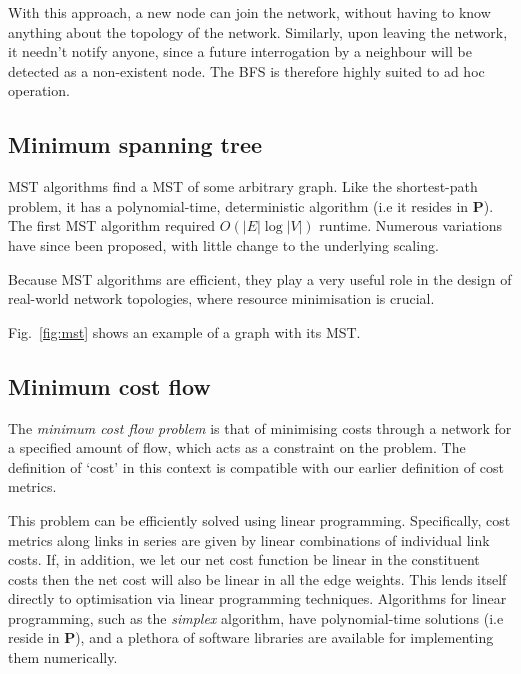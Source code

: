 \documentclass[aps,rmp,twocolumn,amsmath,amssymb,nofootinbib,superscriptaddress]{revtex4}
\begin{document}
With this approach, a new node can join the network, without having to know anything about the topology of the network. Similarly, upon leaving the network, it needn't notify anyone, since a future interrogation by a neighbour will be detected as a non-existent node. The BFS is therefore highly suited to ad hoc operation.

%
%

\subsection{Minimum spanning tree} \label{sec:min_tree}

MST algorithms find a MST of some arbitrary graph. Like the shortest-path problem, it has a polynomial-time, deterministic algorithm (i.e it resides in \textbf{P}). The first MST algorithm \cite{bib:Boruvka26} required $O(|E|\log |V|)$ runtime. Numerous variations have since been proposed, with little change to the underlying scaling.

Because MST algorithms are efficient, they play a very useful role in the design of real-world network topologies, where resource minimisation is crucial.

Fig.~\ref{fig:mst} shows an example of a graph with its MST.

%
%

\subsection{Minimum cost flow} \label{sec:min_cost_flow_prob}

The \emph{minimum cost flow problem} \cite{???} is that of minimising costs through a network for a specified amount of flow, which acts as a constraint on the problem. The definition of `cost' in this context is compatible with our earlier definition of cost metrics.

This problem can be efficiently solved using linear programming. Specifically, cost metrics along links in series are given by linear combinations of individual link costs. If, in addition, we let our net cost function be linear in the constituent costs then the net cost will also be linear in all the edge weights. This lends itself directly to optimisation via linear programming techniques. Algorithms for linear programming, such as the \emph{simplex} algorithm, have polynomial-time solutions (i.e reside in \textbf{P}), and a plethora of software libraries are available for implementing them numerically.
\end{document}

